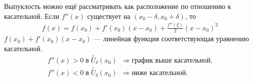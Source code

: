 \begin{note}
Выпуклость можно ещё рассматривать как расположение по отношению к касательной.
Если \(f''(x)\) существует на \((x_0 - \delta, x_0 + \delta)\), то
\begin{gather}
    f(x) = f(x_0) + f'(x_0)(x - x_0) + \frac{f''(\xi)}{2}(x - x_0)^2
\end{gather}
\(f(x_0) + f'(x_0)(x - x_0)\) --- линейная функция соответствующая уравнению
касательной.
\begin{align}
    f''(x) > 0 \; \text{в} \; \overset{\circ}{U}_{\delta}(x_0) &\Rightarrow \;
        \text{график выше касательной,}\\
    f''(x) < 0 \; \text{в} \; \overset{\circ}{U}_{\delta}(x_0) &\Rightarrow \;
        \text{ниже касательной.}
\end{align}
\end{note}
